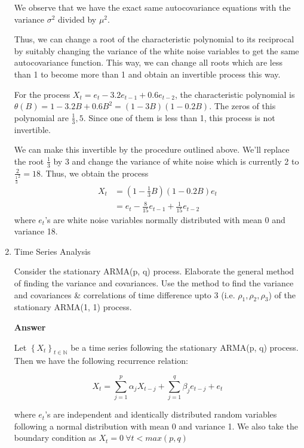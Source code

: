 \documentclass[12pt, oneside]{article}
\begin{document}
\begin{enumerate}
{    We observe that we have the exact same autocovariance equations with the variance
    \(\sigma^2\) divided by \(\mu^2\).
    
    Thus, we can change a root of the characteristic polynomial to its reciprocal by suitably
    changing the variance of the white noise variables to get the same autocovariance function.
    This way, we can change all roots which are less than 1 to become more than 1 and obtain an
    invertible process this way.

    For the process \(X_t = e_t - 3.2 e_{t-1} + 0.6 e_{t-2}\), the characteristic polynomial
    is \(\theta(B) = 1 - 3.2 B + 0.6 B^2 = (1 - 3 B)(1 - 0.2 B)\). The zeros of this
    polynomial are \(\frac{1}{3}, 5\). Since one of them is less than 1, this process is not
    invertible.

    We can make this invertible by the procedure outlined above. We'll replace the root
    \(\frac{1}{3}\) by 3 and change the variance of white noise which is currently 2 to
    \(\frac{2}{\frac{1}{3}^2} = 18\). Thus, we obtain the process
    \begin{align*}
        X_t &= (1 - \frac{1}{3} B)(1 - 0.2 B) e_t \\
            &= e_t - \frac{8}{15} e_{t-1} + \frac{1}{15} e_{t-2}
    \end{align*}
    where \(e_t\)'s are white noise variables normally distributed with mean 0 and variance 18.
}


\item {
    Time Series Analysis

    Consider the stationary ARMA(p, q) process. Elaborate the general method of finding the
    variance and covariances. Use the method to find the variance and covariances \&
    correlations of time difference upto 3 (i.e. \(\rho_1, \rho_2, \rho_3\)) of the stationary ARMA(1, 1)
    process.

    \textbf{Answer}

    Let \(\left\{X_t\right\}_{t \in \mathbb{N}}\) be a time series following the
    stationary ARMA(p, q) process. Then we have the following recurrence relation:

    \[X_t = \sum_{j=1}^{p}\alpha_j X_{t-j} + \sum_{j=1}^{q} \beta_j e_{t-j} + e_t\]

    where \(e_t\)'s are independent and identically distributed random variables following
    a normal distribution with mean 0 and variance 1. We also take the boundary condition as
    \(X_t = 0 ~\forall t < max(p, q)\)

}
\end{enumerate}
\end{document}
